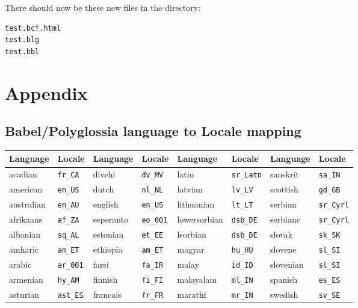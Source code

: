 \documentclass{ltxdockit}
\begin{document}
\noindent There should now be these new files in the directory:

\begin{verbatim}
test.bcf.html
test.blg
test.bbl
\end{verbatim}

\appendix
\section{Appendix}
\subsection{Babel/Polyglossia language to Locale mapping}\label{localemap}

\begin{center}
\footnotesize
\begin{tabular}{alalalal}
\toprule
Language & Locale & Language & Locale & Language & Locale & Language & Locale\\
\midrule
acadian    & \texttt{fr\_CA}  & divehi      & \texttt{dv\_MV}  & latin           & \texttt{sr\_Latn} & sanskrit        & \texttt{sa\_IN}\\
american   & \texttt{en\_US}  & dutch       & \texttt{nl\_NL}  & latvian         & \texttt{lv\_LV} &   scottish        & \texttt{gd\_GB}\\
australian & \texttt{en\_AU}  & english     & \texttt{en\_US}  & lithuanian      & \texttt{lt\_LT} &   serbian         & \texttt{sr\_Cyrl}\\ 
afrikaans  & \texttt{af\_ZA}  & esperanto   & \texttt{eo\_001} & lowersorbian    & \texttt{dsb\_DE} &  serbianc        & \texttt{sr\_Cyrl}\\ 
albanian   & \texttt{sq\_AL}  & estonian    & \texttt{et\_EE}  & lsorbian        & \texttt{dsb\_DE} &  slovak          & \texttt{sk\_SK}\\
amharic    & \texttt{am\_ET}  & ethiopia    & \texttt{am\_ET}  & magyar          & \texttt{hu\_HU} &   slovene         & \texttt{sl\_SI}\\
arabic     & \texttt{ar\_001} & farsi       & \texttt{fa\_IR}  & malay           & \texttt{id\_ID} &   slovenian       & \texttt{sl\_SI}\\
armenian   & \texttt{hy\_AM}  & finnish     & \texttt{fi\_FI}  & malayalam       & \texttt{ml\_IN} &   spanish         & \texttt{es\_ES}\\
asturian   & \texttt{ast\_ES} & francais    & \texttt{fr\_FR}  & marathi         & \texttt{mr\_IN} &   swedish         & \texttt{sv\_SE}\\

\end{tabular}
\end{center}
\end{document}
